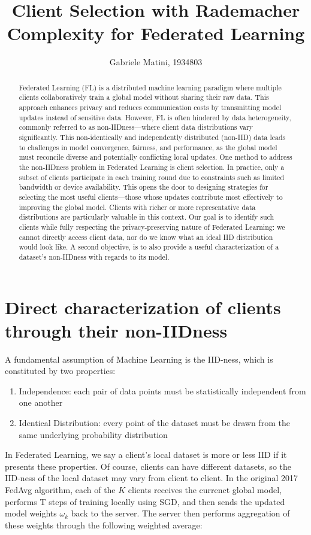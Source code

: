 \documentclass{article}
\title{Client Selection with Rademacher Complexity for Federated Learning}
\author{Gabriele Matini, 1934803}
\date{}
\begin{document}
\maketitle

\begin{abstract}
Federated Learning (FL) is a distributed machine learning paradigm where multiple clients collaboratively train a global model without sharing their raw data. This approach enhances privacy and reduces communication costs by transmitting model updates instead of sensitive data. However, FL is often hindered by data heterogeneity, commonly referred to as non-IIDness—where client data distributions vary significantly. This non-identically and independently distributed (non-IID) data leads to challenges in model convergence, fairness, and performance, as the global model must reconcile diverse and potentially conflicting local updates. One method to address the non-IIDness problem in Federated Learning is client selection. In practice, only a subset of clients participate in each training round due to constraints such as limited bandwidth or device availability. This opens the door to designing strategies for selecting the most useful clients—those whose updates contribute most effectively to improving the global model. Clients with richer or more representative data distributions are particularly valuable in this context. Our goal is to identify such clients while fully respecting the privacy-preserving nature of Federated Learning: we cannot directly access client data, nor do we know what an ideal IID distribution would look like. A second objective, is to also provide a useful characterization of a dataset's non-IIDness with regards to its model.
\end{abstract}

\section{Direct characterization of clients through their non-IIDness}
A fundamental assumption of Machine Learning is the IID-ness, which is constituted by two properties:
\begin{enumerate}
    \item Independence: each pair of data points must be statistically independent from one another
    \item Identical Distribution: every point of the dataset must be drawn from the same underlying probability distribution
\end{enumerate}
In Federated Learning, we say a client's local dataset is more or less IID if it presents these properties. Of course, clients can have different datasets, so the IID-ness of the local dataset may vary from client to client.
In the original 2017 FedAvg algorithm, each of the $K$ clients receives the currenct global model, performs T steps of training locally using SGD, and then sends the updated model weights $\omega_k$ back to the server. The server then performs aggregation of these weights through the following weighted average:
\end{document}
